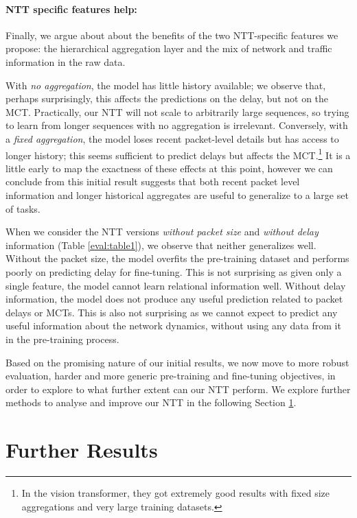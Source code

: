 \paragraph*{NTT specific features help:}
Finally, we argue about about the benefits of the two NTT-specific features we propose: \ie the hierarchical aggregation layer and the mix of network and traffic information in the raw data.

With \emph{no aggregation}, the model has little history available; we observe that, perhaps surprisingly, this affects the predictions on the delay, but not on the MCT. Practically, our NTT will not scale to arbitrarily large sequences, so trying to learn from longer sequences with no aggregation is irrelevant. Conversely, with a \emph{fixed aggregation}, the model loses recent packet-level details but has access to longer history; this seems sufficient to predict delays but affects the MCT.\footnote{In the vision transformer\cite{dosovitskiyImageWorth16x162021}, they got extremely good results with fixed size aggregations and very large training datasets.} It is a little early to map the exactness of these effects at this point, however we can conclude from this initial result suggests that both recent packet level information and longer historical aggregates are useful to generalize to a large set of tasks.


When we consider the NTT versions \emph{without packet size} and \emph{without delay} information (Table \ref{eval:table1}), we observe that neither generalizes well. Without the packet size, the model overfits the pre-training dataset and performs poorly on predicting delay for fine-tuning. This is not surprising as given only a single feature, the model cannot learn relational information well. Without delay information, the model does not produce any useful prediction related to packet delays or MCTs. This is also not surprising as we cannot expect to predict any useful information about the network dynamics, without using any data from it in the pre-training process.

Based on the promising nature of our initial results, we now move to more robust evaluation, harder and more generic pre-training and fine-tuning objectives, in order to explore to what further extent can our NTT perform. We explore further methods to analyse and improve our NTT in the following Section \ref{eval:fres}.


\section{Further Results}
\label{eval:fres}

